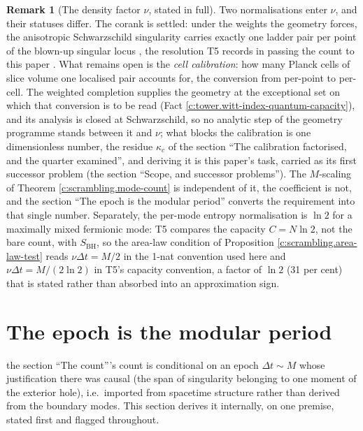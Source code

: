 \documentclass[11pt]{article}
\theoremstyle{definition}
\newtheorem{remark}[theorem]{Remark}
\theoremstyle{plain}
\providecommand{\SBH}{}\renewcommand{\SBH}{S_{\mathrm{BH}}}
\begin{document}
\begin{remark}[The density factor $\nu$, stated in full]\label{c:note.scrambling.density-factor-stated-full}
Two normalisations enter $\nu$, and their statuses differ. The corank is settled: under the weights the geometry forces, the anisotropic Schwarzschild singularity carries exactly one ladder pair per point of the blown-up singular locus \cite[\S 8.9]{ButlerT4}, the resolution T5 records in passing the count to this paper \cite[\S 10]{ButlerT5}. What remains open is the \emph{cell calibration}: how many Planck cells of slice volume one localised pair accounts for, the conversion from per-point to per-cell. The weighted completion supplies the geometry at the exceptional set on which that conversion is to be read (Fact \ref{c:tower.witt-index-quantum-capacity}), and its analysis is closed at Schwarzschild, so no analytic step of the geometry programme stands between it and $\nu$; what blocks the calibration is one dimensionless number, the residue $\kappa_c$ of the section ``The calibration factorised, and the quarter examined'', and deriving it is this paper's task, carried as its first successor problem (the section ``Scope, and successor problems''). The $M$-scaling of Theorem \ref{c:scrambling.mode-count} is independent of it, the coefficient is not, and the section ``The epoch is the modular period'' converts the requirement into that single number. Separately, the per-mode entropy normalisation is $\ln 2$ for a maximally mixed fermionic mode: T5 compares the capacity $C = N\ln 2$, not the bare count, with $\SBH$, so the area-law condition of Proposition \ref{c:scrambling.area-law-test} reads $\nu\Delta t = M/2$ in the 1-nat convention used here and $\nu\Delta t = M/(2\ln 2)$ in T5's capacity convention, a factor of $\ln 2$ (31 per cent) that is stated rather than absorbed into an approximation sign.
\end{remark}

\section{The epoch is the modular period}

\label{c:note.scrambling.setting-epoch-modular-period}
the section ``The count'''s count is conditional on an epoch $\Delta t \sim M$ whose justification there was causal (the span of singularity belonging to one moment of the exterior hole), i.e.\ imported from spacetime structure rather than derived from the boundary modes. This section derives it internally, on one premise, stated first and flagged throughout.
\end{document}
